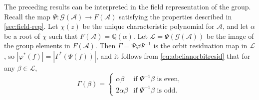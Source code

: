 \documentclass[12pt, letterpaper]{article}
\newcommand{\Q}{\mathbb Q}
\newcommand{\A}{\mathcal A}
\newcommand{\gp}{\mathcal G}
\begin{document}
The preceding results can be interpreted in the field representation of the
group.  Recall the map $\Psi : \gp(\A) \rightarrow F(\A)$ satisfying the
properties described in \cref{sec:field-rep}. Let $\chi(z)$ be the unique
characteristic polynomial for $\A$, and let $\alpha$ be a root of $\chi$ such
that $F(\A) = \Q(\alpha)$. Let $\mathcal L = \Psi(\gp(\A))$ be the image of the
group elements in $F(\A)$. Then $\Gamma = \Psi \varphi \Psi^{-1}$ is the orbit
residuation map in $\mathcal L$, so $|\varphi^*(f)| = |\Gamma^*(\Psi(f))|$, and
it follows from \cref{eq:abelianorbitresid} that for any $\beta \in \mathcal
L$,
\[
    \Gamma(\beta) = \begin{cases}
        \alpha \beta & \text{if $\Psi^{-1} \beta$ is even,}\\
        2\alpha \beta & \text{if $\Psi^{-1} \beta$ is odd.}
    \end{cases}
\]
\end{document}
